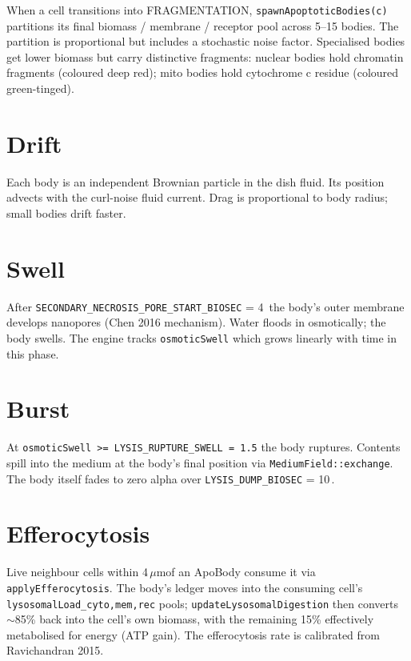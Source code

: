 \documentclass[11pt,letterpaper,twoside,openany]{book}
\newcommand{\code}[1]{\texttt{#1}}
\newcommand{\bioh}{\text{bio-h}}
\newcommand{\biomin}{\text{bio-min}}
\newcommand{\um}{\ensuremath{\mu\text{m}}}
\begin{document}
When a cell transitions into FRAGMENTATION, \code{spawnApoptoticBodies(c)}
partitions its final biomass / membrane / receptor pool across
5--15 bodies. The partition is proportional but includes a
stochastic noise factor. Specialised bodies get lower biomass but
carry distinctive fragments: nuclear bodies hold chromatin fragments
(coloured deep red); mito bodies hold cytochrome c residue (coloured
green-tinged).

\section{Drift}

Each body is an independent Brownian particle in the dish fluid.
Its position advects with the curl-noise fluid current. Drag is
proportional to body radius; small bodies drift faster.

\section{Swell}

After \code{SECONDARY\_NECROSIS\_PORE\_START\_BIOSEC} = 4\,\bioh
the body's outer membrane develops nanopores (Chen 2016 mechanism).
Water floods in osmotically; the body swells. The engine tracks
\code{osmoticSwell} which grows linearly with time in this phase.

\section{Burst}

At \code{osmoticSwell >= LYSIS\_RUPTURE\_SWELL = 1.5} the body
ruptures. Contents spill into the medium at the body's final
position via \code{MediumField::exchange}. The body itself fades
to zero alpha over \code{LYSIS\_DUMP\_BIOSEC} = 10\,\biomin.

\section{Efferocytosis}

Live neighbour cells within 4\,\um of an ApoBody consume it via
\code{applyEfferocytosis}. The body's ledger moves into the
consuming cell's \code{lysosomalLoad\_{cyto,mem,rec}} pools;
\code{updateLysosomalDigestion} then converts $\sim$85\% back into
the cell's own biomass, with the remaining 15\% effectively
metabolised for energy (ATP gain). The efferocytosis rate is
calibrated from Ravichandran 2015.
\end{document}

